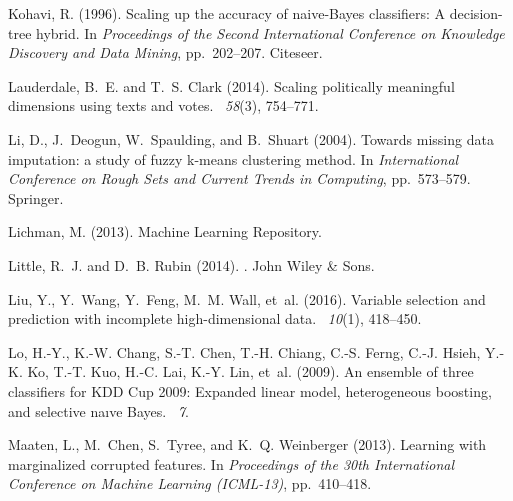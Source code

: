 \documentclass[10pt]{book}
\theoremstyle{definition}
\begin{document}
\begin{thebibliography}{11}
Kohavi, R. (1996).
\newblock Scaling up the accuracy of naive-{B}ayes classifiers: A decision-tree
  hybrid.
\newblock In {\em Proceedings of the Second International Conference on
  Knowledge Discovery and Data Mining}, pp.\  202--207. Citeseer.

Lauderdale, B.~E. and T.~S. Clark (2014).
\newblock Scaling politically meaningful dimensions using texts and votes.
~{\em 58\/}(3),
  754--771.

Li, D., J.~Deogun, W.~Spaulding, and B.~Shuart (2004).
\newblock Towards missing data imputation: a study of fuzzy k-means clustering
  method.
\newblock In {\em International Conference on Rough Sets and Current Trends in
  Computing}, pp.\  573--579. Springer.

Lichman, M. (2013).
 {M}achine {L}earning {R}epository.

Little, R.~J. and D.~B. Rubin (2014).
.
\newblock John Wiley \& Sons.

Liu, Y., Y.~Wang, Y.~Feng, M.~M. Wall, et~al. (2016).
\newblock Variable selection and prediction with incomplete high-dimensional
  data.
~{\em 10\/}(1), 418--450.

Lo, H.-Y., K.-W. Chang, S.-T. Chen, T.-H. Chiang, C.-S. Ferng, C.-J. Hsieh,
  Y.-K. Ko, T.-T. Kuo, H.-C. Lai, K.-Y. Lin, et~al. (2009).
\newblock An ensemble of three classifiers for {KDD} {C}up 2009: Expanded
  linear model, heterogeneous boosting, and selective na{\i}ve {B}ayes.
~{\em 7}.

Maaten, L., M.~Chen, S.~Tyree, and K.~Q. Weinberger (2013).
\newblock Learning with marginalized corrupted features.
\newblock In {\em Proceedings of the 30th International Conference on Machine
  Learning (ICML-13)}, pp.\  410--418.


\end{thebibliography}
\end{document}

